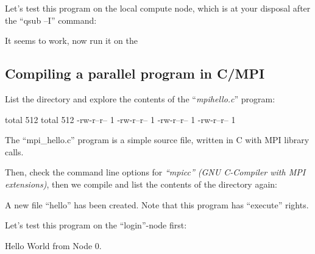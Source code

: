 Let's test this program on the local compute node, which is at your disposal
after the ``qsub --I'' command:



It seems to work, now run it on the \hpc

\begin{prompt}
\end{prompt}

\subsection{Compiling a parallel program in C/MPI}

\begin{prompt}
\end{prompt}

List the directory and explore the contents of the ``\textit{mpihello.c}'' program:

\begin{prompt}
total 512
total 512
-rw-r--r-- 1 %
-rw-r--r-- 1 %
-rw-r--r-- 1 %
-rw-r--r-- 1 %
\end{prompt}


The ``mpi\_hello.c'' program is a simple source file, written in C with MPI library calls.

Then, check the command line options for \emph{``mpicc'' (GNU C-Compiler with
MPI extensions)}, then we compile and list the contents of the directory again:

\begin{prompt}
\end{prompt}

A new file ``hello'' has been created. Note that this program has ``execute''
rights.

Let's test this program on the ``login''-node first:

\begin{prompt}
Hello World from Node 0.
\end{prompt}

